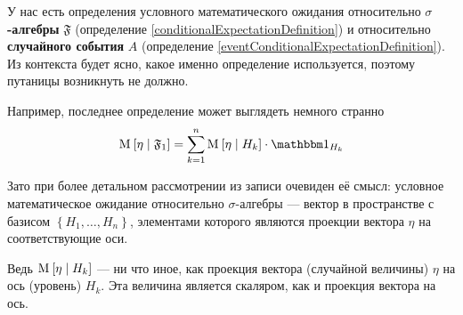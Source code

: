 \begin{remark}
    У нас есть определения условного математического ожидания
    относительно \textbf{$\sigma$-алгебры} $\mathfrak{F}$ (определение
    \ref{conditionalExpectationDefinition})
    и относительно \textbf{случайного события} $A$ (определение 
    \ref{eventConditionalExpectationDefinition}).
    Из контекста будет ясно, какое именно определение используется,
    поэтому путаницы возникнуть не должно.

    Например, последнее определение может выглядеть немного странно
    $$\Mean{ \eta \mcond \mathfrak{F}_1 }
        = \sum_{k=1}^n \Mean{ \eta \mcond H_k }
            \cdot \indicatorof{H_k}$$

    Зато при более детальном рассмотрении из записи очевиден её смысл:
    условное математическое ожидание относительно $\sigma$-алгебры --- вектор
    в пространстве с базисом $\left\{ H_1, \dots, H_n \right\}$, элементами
    которого являются проекции вектора $\eta$ на соответствующие оси.
    
    Ведь $\operatorname{M}_{} \left[  \eta \;\middle|\; H_k  \right]$ --- ни что иное, как проекция
    вектора (случайной величины) $\eta$ на ось (уровень) $H_k$.
    Эта величина является скаляром, как и проекция вектора на ось.
\end{remark}

